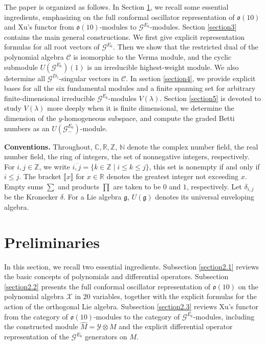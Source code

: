 \documentclass[12pt]{article}
\numberwithin{equation}{section}
\theoremstyle{definition}
\theoremstyle{remark}
\begin{document}
The paper is organized as follows. In Section \ref{section2}, we recall some essential ingredients, emphasizing on the full conformal oscillator representation of $\mathfrak{o}(10)$ and Xu's functor from $\mathfrak{o}(10)$-modules to $\mathscr{G}^{E_6}$-modules. Section \ref{section3} contains the main general constructions. We first give explicit representation formulas for all root vectors of $\mathscr{G}^{E_6}$. Then we show that the restricted dual of the polynomial algebra $\mathscr{C}$ is isomorphic to the Verma module, and the cyclic submodule $U(\mathscr{G}^{E_6})(1)$ is an irreducible highest‑weight module. We also determine all $\mathscr{G}^{D_5}$-singular vectors in $\mathscr{C}$. In section \ref{section4}, we provide explicit bases for all the six fundamental modules and a finite spanning set for arbitrary finite-dimensional irreducible $\mathscr{G}^{E_6}$-modules $V(\lambda)$. Section \ref{section5} is devoted to study $V(\lambda)$ more deeply when it is finite dimensional, we determine the dimension of the $y$-homogeneous subspace, and compute the graded Betti numbers as an $U(\mathscr{G}^{E_6}_-)$-module.


\textbf{Conventions.} Throughout, $\mathbb{C},\mathbb{R},\mathbb{Z}$, $\mathbb{N}$ denote the complex number field, the real number field, the ring of integers, the set of nonnegative integers, respectively. For $i,j\in\mathbb{Z}$, we write $\overline{i,j}=\{k\in\mathbb{Z}\mid i\leqslant k\leqslant j\}$, this set is nonempty if and only if $i\leqslant j$. The bracket $\llbracket x\rrbracket$ for $x\in\mathbb{R}$ denotes the greatest integer not exceeding $x$. Empty sums $\sum$ and products $\prod$ are taken to be $0$ and $1$, respectively.
Let $\delta_{i,j}$ be the Kronecker $\delta$. For a Lie algebra $\mathfrak{g}$, $U(\mathfrak{g})$ denotes its universal enveloping algebra. 

\section{Preliminaries}\label{section2}
In this section, we recall two essential ingredients. Subsection \ref{section2.1} reviews the basic concepts of polynomials and differential operators. Subsection \ref{section2.2} presents the full conformal oscillator representation of $\mathfrak{o}(10)$ on the polynomial algebra $\mathscr{X}$ in $20$ variables, together with the explicit formulas for the action of the orthogonal Lie algebra. Subsection \ref{section2.3} reviews Xu’s functor from the category of $\mathfrak{o}(10)$-modules to the category of $\mathscr{G}^{E_6}$-modules, including the constructed module
$\widehat{M}=\mathscr{Y}\otimes M$ and the explicit differential operator representation of the $\mathscr{G}^{E_6}$ generators on $\widehat{M}$.
\end{document}
